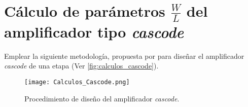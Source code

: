 \section{Cálculo de parámetros $\frac{W}{L}$ del amplificador tipo \textit{cascode} \label{sec:s1}}

\begin{center}
	\begin{minipage}{12cm}
		\begin{tcolorbox}[title=Actividad 1]
			Emplear la siguiente metodología, propuesta por \cite{Allen_2012} para diseñar el amplificador \textit{cascode} de una etapa (Ver \autoref{fig:calculos_cascode}).
		\end{tcolorbox}	
	\end{minipage}
\end{center}

\begin{figure}[H]
	\centering
	\texttt{[image: Calculos\_Cascode.png]}
	\caption{Procedimiento de diseño del amplificador \textit{cascode}. \label{fig:calculos_cascode}}
\end{figure}

